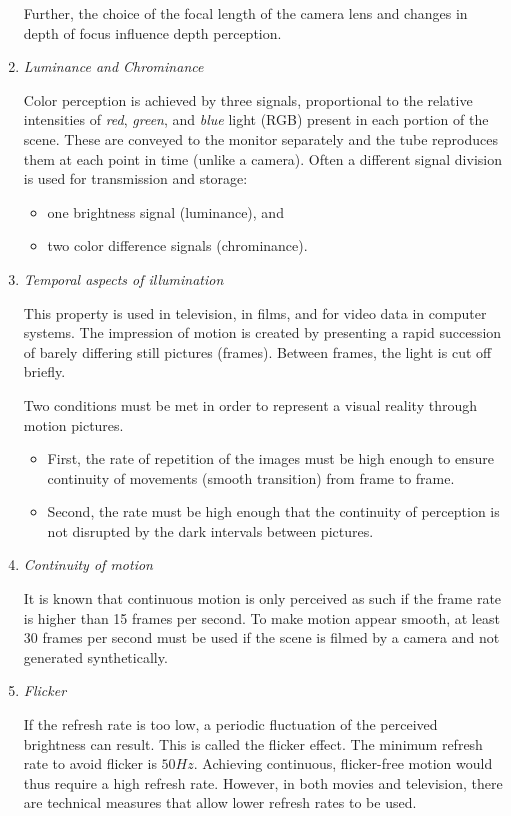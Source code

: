 \begin{enumerate}
Further, the choice of the focal length of the camera lens and changes in depth of focus influence depth perception.
	
\item \textit{Luminance and Chrominance}

Color perception is achieved by three signals, proportional to the relative intensities of \textit{red}, \textit{green}, and \textit{blue} light (RGB) present in each portion of the scene. These	are conveyed to the monitor separately and the tube reproduces them at each point in time (unlike a camera). Often a different signal division is used for transmission and storage: 
\begin{itemize}
	\item one brightness signal (luminance), and 
	\item two color difference signals (chrominance).
\end{itemize}


\item \textit{Temporal aspects of illumination}	 

This property is used in television, in films, and for video data in computer systems. The impression of motion is created by presenting a rapid succession of barely differing still pictures (frames). Between frames, the light is cut off briefly. 

Two conditions must be met in order to represent a visual reality through motion pictures.
\begin{itemize}
	\item First, the rate of repetition of the images must be high enough to ensure continuity of movements (smooth transition) from frame to frame. 
	\item Second, the rate must be high enough that the continuity of perception is not disrupted by the dark intervals between pictures.
\end{itemize}


\item \textit{Continuity of motion}

	It is known that continuous motion is only perceived as such if the frame rate is higher than 15 frames per second. To make motion appear smooth, at least 30 frames per second must be used if the scene is filmed by a camera and not generated synthetically.
		
\item \textit{Flicker}
	
	If the refresh rate is too low, a periodic fluctuation of the perceived brightness can result. This is called the flicker effect. The minimum refresh rate to avoid flicker is $ 50Hz $. Achieving continuous, flicker-free motion would thus require a high refresh rate. However, in both movies and television, there are technical measures	that allow lower refresh rates to be used.


\end{enumerate}

